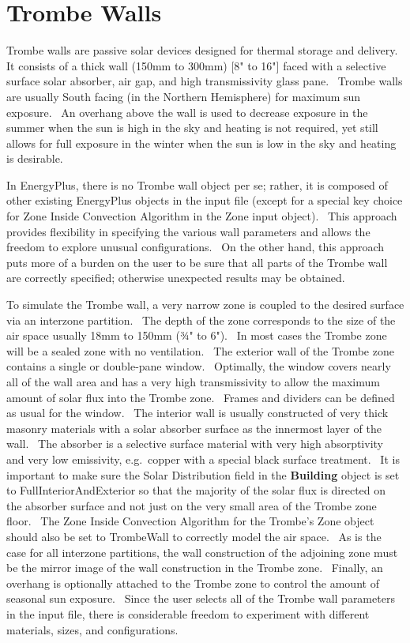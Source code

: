 \section{Trombe Walls }\label{trombe-walls}

Trombe walls are passive solar devices designed for thermal storage and delivery.~ It consists of a thick wall (150mm to 300mm) {[}8" to 16"{]} faced with a selective surface solar absorber, air gap, and high transmissivity glass pane.~ Trombe walls are usually South facing (in the Northern Hemisphere) for maximum sun exposure.~ An overhang above the wall is used to decrease exposure in the summer when the sun is high in the sky and heating is not required, yet still allows for full exposure in the winter when the sun is low in the sky and heating is desirable.

In EnergyPlus, there is no Trombe wall object per se; rather, it is composed of other existing EnergyPlus objects in the input file (except for a special key choice for Zone Inside Convection Algorithm in the Zone input object).~ This approach provides flexibility in specifying the various wall parameters and allows the freedom to explore unusual configurations.~ On the other hand, this approach puts more of a burden on the user to be sure that all parts of the Trombe wall are correctly specified; otherwise unexpected results may be obtained.

To simulate the Trombe wall, a very narrow zone is coupled to the desired surface via an interzone partition.~ The depth of the zone corresponds to the size of the air space usually 18mm to 150mm (¾" to 6").~ In most cases the Trombe zone will be a sealed zone with no ventilation.~ The exterior wall of the Trombe zone contains a single or double-pane window.~ Optimally, the window covers nearly all of the wall area and has a very high transmissivity to allow the maximum amount of solar flux into the Trombe zone.~ Frames and dividers can be defined as usual for the window.~ The interior wall is usually constructed of very thick masonry materials with a solar absorber surface as the innermost layer of the wall.~ The absorber is a selective surface material with very high absorptivity and very low emissivity, e.g.~copper with a special black surface treatment.~ It is important to make sure the Solar Distribution field in the \textbf{Building} object is set to FullInteriorAndExterior so that the majority of the solar flux is directed on the absorber surface and not just on the very small area of the Trombe zone floor. ~The Zone Inside Convection Algorithm for the Trombe's Zone object should also be set to TrombeWall to correctly model the air space.~ As is the case for all interzone partitions, the wall construction of the adjoining zone must be the mirror image of the wall construction in the Trombe zone.~ Finally, an overhang is optionally attached to the Trombe zone to control the amount of seasonal sun exposure.~ Since the user selects all of the Trombe wall parameters in the input file, there is considerable freedom to experiment with different materials, sizes, and configurations.

